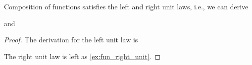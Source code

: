 \begin{lem}\label{lem:fun_unit}
Composition of functions satisfies the left and right unit laws, i.e., we can derive
\begin{prooftree}
\end{prooftree}
and
\begin{prooftree}
\end{prooftree}
\end{lem}

\begin{proof}
The derivation for the left unit law is
\begin{prooftree}
\end{prooftree}
The right unit law is left as \cref{ex:fun_right_unit}.
\end{proof}

